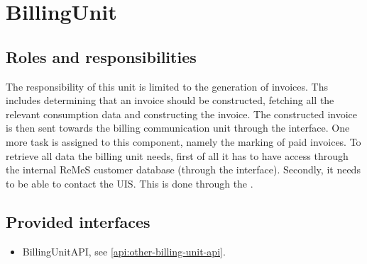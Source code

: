 \section{BillingUnit}
\label{element:billing-unit}

\subsection{Roles and responsibilities}

\npar The responsibility of this unit is limited to the generation of invoices.
Ths includes determining that an invoice should be constructed, fetching all the
relevant consumption data and constructing the invoice. The constructed invoice
is then sent towards the billing communication unit through the
 interface. One more task is assigned to this
component, namely the marking of paid invoices. To retrieve all data the
billing unit needs, first of all it has to have access through the internal
ReMeS customer database (through the  interface).
Secondly, it needs to be able to contact the UIS. This is done through the
.

\subsection{Provided interfaces}

\begin{itemize}
  \item BillingUnitAPI, see \ref{api:other-billing-unit-api}.
\end{itemize}